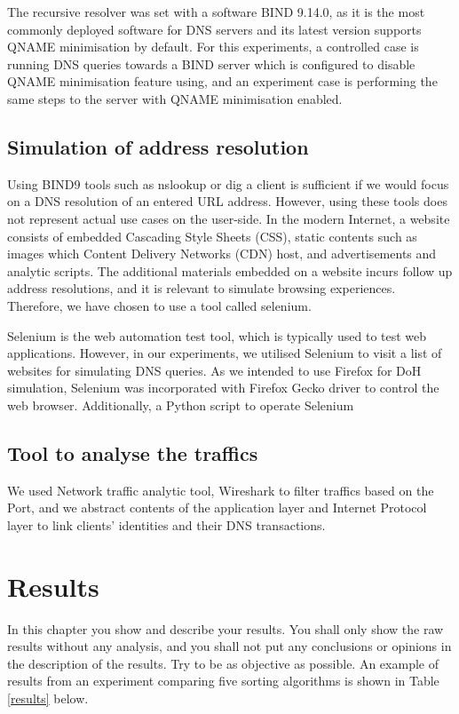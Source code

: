 \documentclass[a4paper,12pt]{article}
\begin{document}
The recursive resolver was set with a software BIND 9.14.0, as it is the most commonly deployed software for DNS servers and its latest version supports QNAME minimisation by default\cite{bind9qname}.
For this experiments, a controlled case is running DNS queries towards a BIND server which is configured to disable QNAME minimisation feature using, and an experiment case is performing the same steps to the server with QNAME minimisation enabled.



\subsection{Simulation of address resolution}\label{simulation}
Using BIND9 tools such as nslookup or dig a client is sufficient if we would focus on a DNS resolution of an entered URL address. However, using these tools does not represent actual use cases on the user-side. In the modern Internet, a website consists of embedded Cascading Style Sheets (CSS), static contents such as images which Content Delivery Networks (CDN) host, and advertisements and analytic scripts. The additional materials embedded on a website incurs follow up address resolutions, and it is relevant to simulate browsing experiences.
Therefore, we have chosen to use a tool called selenium. 

Selenium is the web automation test tool\cite{holmes2006automating}, which is typically used to test web applications. However, in our experiments, we utilised Selenium to visit a list of websites for simulating DNS queries. As we intended to use Firefox for DoH simulation, Selenium was incorporated with Firefox Gecko driver to control the web browser. Additionally, a Python script to operate Selenium

\subsection{Tool to analyse the traffics}
We used Network traffic analytic tool, Wireshark to filter traffics based on the Port, and we abstract contents of the application layer and Internet Protocol layer to link clients' identities and their DNS transactions.
\newpage

\section{Results}
In this chapter you show and describe your results. You shall only show the raw results without any analysis, and you shall not put any conclusions or opinions in the description of the results. Try to be as objective as possible. An example of results from an experiment comparing five sorting algorithms is shown in Table \ref{results} below.\\
\end{document}
